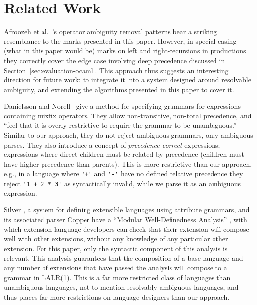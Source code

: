 \documentclass[runningheads]{llncs}
\begin{document}
\section{Related Work}

Afroozeh et al.~\cite{afroozehSafeSpecificationOperator2013}'s operator ambiguity removal patterns bear a striking resemblance to the marks presented in this paper. However, in special-casing (what in this paper would be) marks on left and right-recursions in productions they correctly cover the edge case involving deep precedence discussed in Section~\ref{sec:evaluation-ocaml}. This approach thus suggests an interesting direction for future work: to integrate it into a system designed around resolvable ambiguity, and extending the algorithms presented in this paper to cover it.

Danielsson and Norell~\cite{danielssonParsingMixfixOperators2011} give a method for specifying grammars for expressions containing mixfix operators. They allow non-transitive, non-total precedence, and ``feel that it is overly restrictive to require the grammar to be unambiguous.'' Similar to our approach, they do not reject ambiguous grammars, only ambiguous parses. They also introduce a concept of \emph{precedence correct} expressions; expressions where direct children must be related by precedence (children must have higher precedence than parents). This is more restrictive than our approach, e.g., in a language where \verb|'+'| and \verb|'-'| have no defined relative precedence they reject \verb|'1 + 2 * 3'| as syntactically invalid, while we parse it as an ambiguous expression.

Silver \cite{vanwykSilverExtensibleAttribute2010}, a system for defining extensible languages using attribute grammars, and its associated parser Copper \cite{vanwykContextawareScanningParsing2007} have a ``Modular Well-Definedness Analysis'' \cite{kaminskiModularWellDefinednessAnalysis2013}, with which extension language developers can check that their extension will compose well with other extensions, without any knowledge of any particular other extension. For this paper, only the syntactic component \cite{schwerdfegerVerifiableCompositionDeterministic2009} of this analysis is relevant. This analysis guarantees that the composition of a base language and any number of extensions that have passed the analysis will compose to a grammar in LALR(1). This is a far more restricted class of languages than unambiguous languages, not to mention resolvably ambiguous languages, and thus places far more restrictions on language designers than our approach.
\end{document}
